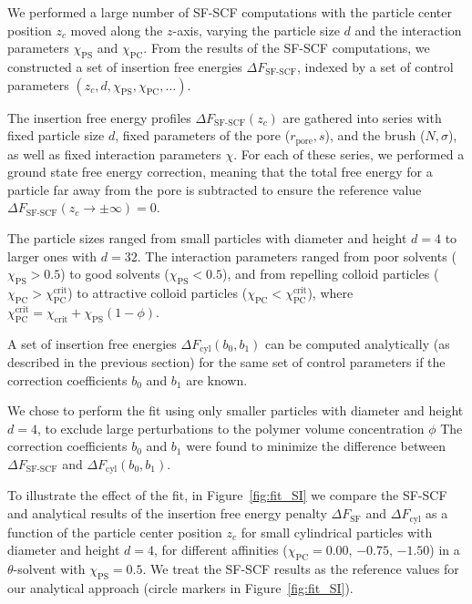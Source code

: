 \documentclass[10pt, a4paper]{article}
\begin{document}
\begin{multicols}{2}
We performed a large number of SF-SCF computations with the particle center position $z_c$ moved along the $z$-axis, varying the particle size $d$ and the interaction parameters $\chi_{\textrm{PS}}$ and $\chi_{\textrm{PC}}$.
From the results of the SF-SCF computations, we constructed a set of insertion free energies $\Delta F_{\textrm{SF-SCF}}$, indexed by a set of control parameters $(z_c, d, \chi_{\textrm{PS}}, \chi_{\textrm{PC}}, \dots)$.

The insertion free energy profiles $\Delta F_{\textrm{SF-SCF}}(z_c)$ are gathered into series with fixed particle size $d$, fixed parameters of the pore ($r_{\textrm{pore}}, s$), and the brush ($N, \sigma$), as well as fixed interaction parameters $\chi$.
For each of these series, we performed a ground state free energy correction, meaning that the total free energy for a particle far away from the pore is subtracted to ensure the reference value $\Delta F_{\text{SF-SCF}}(z_c \to \pm \infty) = 0$.

The particle sizes ranged from small particles with diameter and height $d = 4$ to larger ones with $d = 32$.
The interaction parameters ranged from poor solvents ($\chi_{\textrm{PS}} > 0.5$) to good solvents ($\chi_{\textrm{PS}} < 0.5$), and from repelling colloid particles ($\chi_{\textrm{PC}} > \chi_{\textrm{PC}}^{\textrm{crit}}$) to attractive colloid particles ($\chi_{\textrm{PC}} < \chi_{\textrm{PC}}^{\textrm{crit}}$), where $\chi_{\textrm{PC}}^{\textrm{crit}} = \chi_{\textrm{crit}} + \chi_{\textrm{PS}} (1 - \phi)$.

A set of insertion free energies $\Delta F_{\textrm{cyl}}(b_0, b_1)$ can be computed analytically (as described in the previous section) for the same set of control parameters if the correction coefficients $b_0$ and $b_1$ are known.

We chose to perform the fit using only smaller particles with diameter and height $d = 4$, to exclude large perturbations to the polymer volume concentration $\phi$
The correction coefficients $b_0$ and $b_1$ were found to minimize the difference between $\Delta F_{\textrm{SF-SCF}}$ and $\Delta F_{\textrm{cyl}}(b_0, b_1)$.

To illustrate the effect of the fit, in Figure~\ref{fig:fit_SI} we compare the SF-SCF and analytical results of the insertion free energy penalty $\Delta F_{\textrm{SF}}$ and $\Delta F_{\textrm{cyl}}$ as a function of the particle center position $z_c$ for small cylindrical particles with diameter and height $d = 4$, for different affinities ($\chi_{\textrm{PC}} = 0.00$, $-0.75$, $-1.50$) in a $\theta$-solvent with $\chi_{\textrm{PS}} = 0.5$.
We treat the SF-SCF results as the reference values for our analytical approach (circle markers in Figure~\ref{fig:fit_SI}).


\end{multicols}
\end{document}
